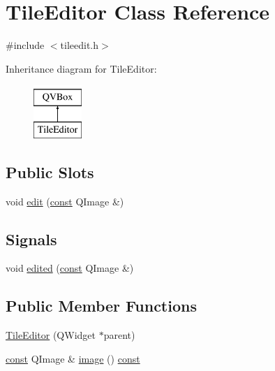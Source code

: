 \hypertarget{classTileEditor}{\section{Tile\+Editor Class Reference}
\label{classTileEditor}
}


{\ttfamily \#include $<$tileedit.\+h$>$}

Inheritance diagram for Tile\+Editor\+:\begin{figure}[H]
\begin{center}
\leavevmode
\includegraphics[height=2.000000cm]{classTileEditor}
\end{center}
\end{figure}
\subsection*{Public Slots}
\begin{DoxyCompactItemize}
\item 
void \hyperlink{classTileEditor_a67481bbbeca7f18d7f589ae0c8967a64}{edit} (\hyperlink{tradstdc_8h_a2c212835823e3c54a8ab6d95c652660e}{const} Q\+Image \&)
\end{DoxyCompactItemize}
\subsection*{Signals}
\begin{DoxyCompactItemize}
\item 
void \hyperlink{classTileEditor_a0bd46b8dee8010a6bce266897c769cca}{edited} (\hyperlink{tradstdc_8h_a2c212835823e3c54a8ab6d95c652660e}{const} Q\+Image \&)
\end{DoxyCompactItemize}
\subsection*{Public Member Functions}
\begin{DoxyCompactItemize}
\item 
\hyperlink{classTileEditor_a08eeeade0efafabb48448767fef6ef0a}{Tile\+Editor} (Q\+Widget $\ast$parent)
\item 
\hyperlink{tradstdc_8h_a2c212835823e3c54a8ab6d95c652660e}{const} Q\+Image \& \hyperlink{classTileEditor_aa957028bd243f8cce95ca99703286757}{image} () \hyperlink{tradstdc_8h_a2c212835823e3c54a8ab6d95c652660e}{const} 
\end{DoxyCompactItemize}
